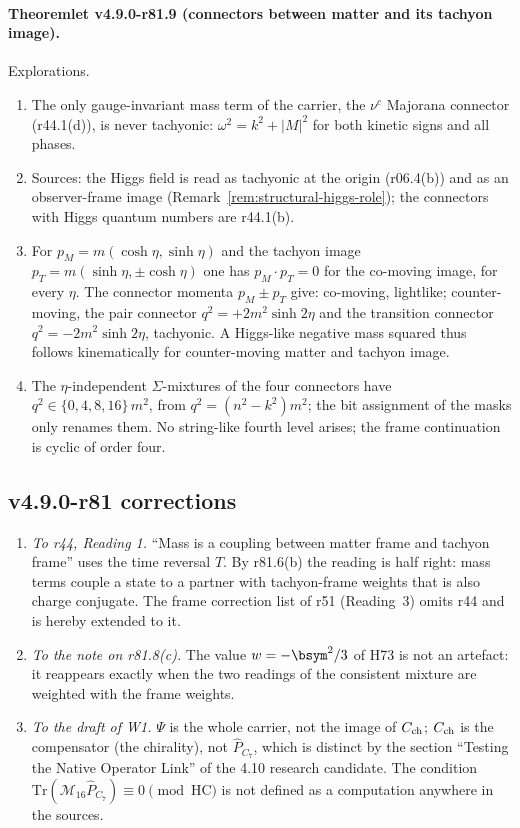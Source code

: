\paragraph{Theoremlet v4.9.0-r81.9 (connectors between matter and its tachyon image).}
Explorations.
\begin{enumerate}[leftmargin=2em]
\item[(a)] The only gauge-invariant mass term of the carrier, the \(\nu^c\) Majorana connector (r44.1(d)), is never tachyonic:
\(\omega^2=k^2+|M|^2\) for both kinetic signs and all phases.
\item[(b)] Sources: the Higgs field is read as tachyonic at the origin (r06.4(b)) and as an observer-frame image
(Remark~\ref{rem:structural-higgs-role}); the connectors with Higgs quantum numbers are r44.1(b).
\item[(c)] For \(p_M=m(\cosh\eta,\sinh\eta)\) and the tachyon image \(p_T=m(\sinh\eta,\pm\cosh\eta)\) one has \(p_M\cdot p_T=0\) for the
co-moving image, for every \(\eta\).  The connector momenta \(p_M\pm p_T\) give: co-moving, lightlike; counter-moving, the pair connector
\(q^2=+2m^2\sinh2\eta\) and the transition connector \(q^2=-2m^2\sinh2\eta\), tachyonic.  A Higgs-like negative mass squared thus follows
kinematically for counter-moving matter and tachyon image.
\item[(d)] The \(\eta\)-independent \(\Sigma\)-mixtures of the four connectors have \(q^2\in\{0,4,8,16\}\,m^2\), from \(q^2=(n^2-k^2)m^2\);
the bit assignment of the masks only renames them.  No string-like fourth level arises; the frame continuation is cyclic of order four.
\end{enumerate}

\subsection*{v4.9.0-r81 corrections}
\label{subsec:v490-r81-corrections}

\begin{enumerate}[leftmargin=2em]
\item \emph{To r44, Reading 1.}  ``Mass is a coupling between matter frame and tachyon frame'' uses the time reversal \(T\).  By r81.6(b) the
reading is half right: mass terms couple a state to a partner with tachyon-frame weights that is also charge conjugate.  The frame
correction list of r51 (Reading~3) omits r44 and is hereby extended to it.
\item \emph{To the note on r81.8(c).}  The value \(w=-\bsym^2/3\) of H73 is not an artefact: it reappears exactly when the two readings
of the consistent mixture are weighted with the frame weights.
\item \emph{To the draft of W1.}  \(\Psi\) is the whole carrier, not the image of \(C_{\rm ch}\); \(C_{\rm ch}\) is the compensator (the
chirality), not \(\hat P_{C_7}\), which is distinct by the section ``Testing the Native Operator Link'' of the 4.10 research candidate.  The condition \(\mathrm{Tr}(\mathcal M_{16}\hat P_{C_7})\equiv0
\pmod{\mathrm{HC}}\) is not defined as a computation anywhere in the sources.
\end{enumerate}

